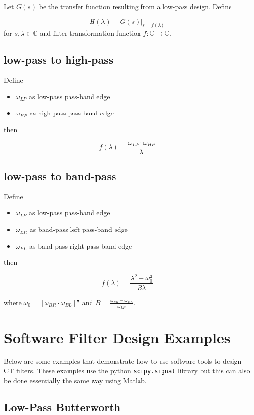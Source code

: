 \documentclass{article}
\begin{document}
Let $G(s)$ be the transfer function resulting from a low-pass design. Define

\[
H(\lambda) = \left. G(s) \right|_{s = f(\lambda)}
\]
for $s,\lambda\in\mathbb{C}$ and filter transformation function $f:\mathbb{C} \rightarrow \mathbb{C}$.

\subsection{low-pass to high-pass}

Define
\begin{itemize}
\item $\omega_{LP}$ as low-pass pass-band edge
\item $\omega_{HP}$ as high-pass pass-band edge
\end{itemize}
then

\[
f(\lambda) = \frac{\omega_{LP}\cdot \omega_{HP}}{\lambda}
\]

\subsection{low-pass to band-pass}

Define
\begin{itemize}
\item $\omega_{LP}$ as low-pass pass-band edge
\item $\omega_{BR}$ as band-pass left pass-band edge
\item $\omega_{BL}$ as band-pass right pass-band edge
\end{itemize}
then

\[
f(\lambda) = \frac{\lambda^2 + \omega_0^2}{B\lambda}
\]

where $\omega_0 = \left[ \omega_{BR}\cdot\omega_{BL}\right]^{\frac{1}{2}}$ and $B=\frac{\omega_{BR}-\omega_{BL}}{\omega_{LP}}$.

\section{Software Filter Design Examples}

Below are some examples that demonstrate how to use software tools to design CT filters. These examples use the python \texttt{scipy.signal} library but this can also be done essentially the same way using Matlab.

\subsection{Low-Pass Butterworth}
\end{document}
